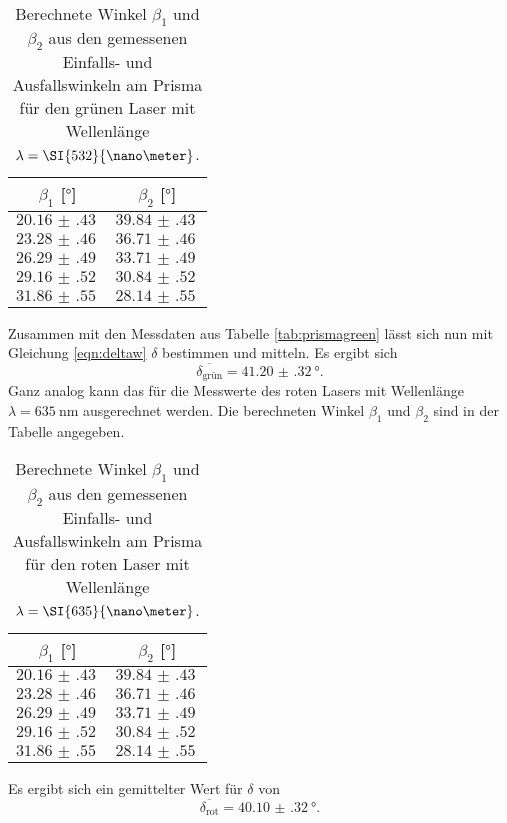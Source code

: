 \begin{table}
    \centering
    \caption{Berechnete Winkel $\beta_1$ und $\beta_2$ aus den gemessenen Einfalls- und Ausfallswinkeln am Prisma für den grünen Laser mit Wellenlänge $\protect \lambda = \SI{532}{\nano\meter}$.}
    \label{tab:prismagreenber}
    \begin{tabular}{c c}
        \toprule
        $\beta_1$ [$\si{\degree}$] & $\beta_2$ [$\si{\degree}$] \\
        \midrule
        $\SI{20.16(43)}{}$ & $\SI{39.84(43)}{}$\\
        $\SI{23.28(46)}{}$ & $\SI{36.71(46)}{}$\\  
        $\SI{26.29(49)}{}$ & $\SI{33.71(49)}{}$\\
        $\SI{29.16(52)}{}$ & $\SI{30.84(52)}{}$\\
        $\SI{31.86(55)}{}$ & $\SI{28.14(55)}{}$\\
        \bottomrule    
    \end{tabular}
\end{table}

Zusammen mit den Messdaten aus Tabelle \ref{tab:prismagreen} lässt sich nun mit Gleichung \ref{eqn:deltaw} $\delta$ bestimmen und mitteln. Es ergibt sich
\begin{equation}
    \overline{\delta_{\text{grün}}} = \SI{41.20(32)}{\degree}.
\end{equation}
Ganz analog kann das für die Messwerte des roten Lasers mit Wellenlänge $\lambda = \SI{635}{\nano\meter}$ ausgerechnet werden.
Die berechneten Winkel $\beta_1$ und $\beta_2$ sind in der Tabelle \label{tab:prismaredber} angegeben.

\begin{table}
    \centering
    \caption{Berechnete Winkel $\beta_1$ und $\beta_2$ aus den gemessenen Einfalls- und Ausfallswinkeln am Prisma für den roten Laser mit Wellenlänge $\protect \lambda = \SI{635}{\nano\meter}$.}
    \label{tab:prismaredber}
    \begin{tabular}{c c}
        \toprule
        $\beta_1$ [$\si{\degree}$] & $\beta_2$ [$\si{\degree}$] \\
        \midrule
        $\SI{20.16(43)}{}$ & $\SI{39.84(43)}{}$\\
        $\SI{23.28(46)}{}$ & $\SI{36.71(46)}{}$\\  
        $\SI{26.29(49)}{}$ & $\SI{33.71(49)}{}$\\
        $\SI{29.16(52)}{}$ & $\SI{30.84(52)}{}$\\
        $\SI{31.86(55)}{}$ & $\SI{28.14(55)}{}$\\
        \bottomrule    
    \end{tabular}
\end{table}
Es ergibt sich ein gemittelter Wert für $\delta$ von
\begin{equation}
\overline{\delta_{\text{rot}}} = \SI{40.10(32)}{\degree}.
\end{equation}


